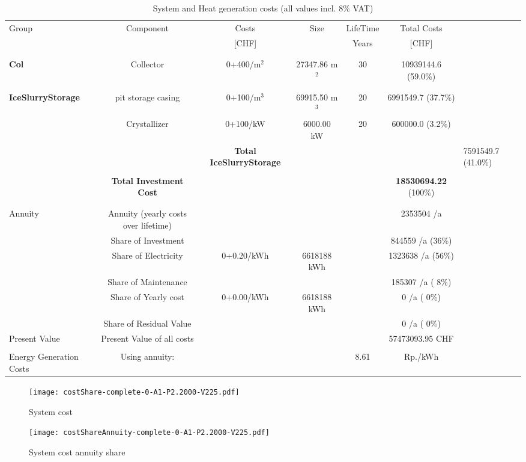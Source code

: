 \documentclass[english]{SPFShortReport}
\begin{document}
\begin{table}[!ht]
\centering
\caption{System and Heat generation costs (all values incl. 8$\%$ VAT) }
\begin{adjustbox}{max width =\textwidth}
\begin{tabular}{l | c c c c c } 
\hline
\hline
Group &Component &Costs &Size &LifeTime &Total Costs \\ 
 & &[CHF] & &Years &[CHF]\\ 
\hline
\\
\hline \\
\textbf{Col} & Collector & 0+400/m$^2$ & 27347.86 m$^2$ & 30 & 10939144.6 (59.0\%) \\
\hline \\
\hline \\
\textbf{IceSlurryStorage} & pit storage casing & 0+100/m$^3$ & 69915.50 m$^3$ & 20 & 6991549.7 (37.7\%) \\
 & Crystallizer & 0+100/kW & 6000.00 kW & 20 & 600000.0 (3.2\%) \\
&
 & \textbf{Total IceSlurryStorage} & & & & 7591549.7 (41.0\%) \\
\hline \\
 & \textbf{Total Investment Cost} & & & & \textbf{18530694.22} (100\%) \\ 
\hline \\ 
\hline \\ 
Annuity & Annuity (yearly costs over lifetime)  &&& & 2353504 /a  \\
 & Share of Investment & &&& 844559 /a (36\%) \\
 & Share of Electricity & 0+0.20/kWh & 6618188 kWh &  & 1323638 /a (56\%)\\
 & Share of Maintenance & &&& 185307 /a ( 8\%)\\ 
 & Share of Yearly cost & 0+0.00/kWh & 6618188 kWh & &  0 /a ( 0\%)\\
 & Share of Residual Value &&& &  0 /a ( 0\%)\\
Present Value  & Present Value of all costs  & &&& 57473093.95 CHF \\
\hline \\ 
 Energy Generation Costs & Using annuity: &&& 8.61 & Rp./kWh \\
\hline
\hline
\end{tabular}
\end{adjustbox}
\label{CostsTable}
\end{table}
\begin{figure}[!htbp]
\begin{center}
\texttt{[image: costShare-complete-0-A1-P2.2000-V225.pdf]}
\caption{System cost}
\label{systemCost}
\end{center}
\end{figure}
\begin{figure}[!htbp]
\begin{center}
\texttt{[image: costShareAnnuity-complete-0-A1-P2.2000-V225.pdf]}
\caption{System cost annuity share}
\label{systemCostannuity}
\end{center}
\end{figure}
\end{document}
